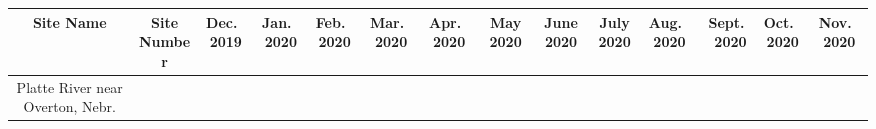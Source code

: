 \documentclass[12pt,]{article}
\begin{document}
\begin{longtable}[]{@{}cccccccccccccc@{}}
\toprule
\begin{minipage}[b]{0.05\columnwidth}\centering
Site Name\strut
\end{minipage} & \begin{minipage}[b]{0.06\columnwidth}\centering
Site Number\strut
\end{minipage} & \begin{minipage}[b]{0.05\columnwidth}\centering
Dec.~2019\strut
\end{minipage} & \begin{minipage}[b]{0.04\columnwidth}\centering
Jan.~2020\strut
\end{minipage} & \begin{minipage}[b]{0.05\columnwidth}\centering
Feb.~2020\strut
\end{minipage} & \begin{minipage}[b]{0.05\columnwidth}\centering
Mar.~2020\strut
\end{minipage} & \begin{minipage}[b]{0.05\columnwidth}\centering
Apr.~2020\strut
\end{minipage} & \begin{minipage}[b]{0.04\columnwidth}\centering
May 2020\strut
\end{minipage} & \begin{minipage}[b]{0.05\columnwidth}\centering
June 2020\strut
\end{minipage} & \begin{minipage}[b]{0.05\columnwidth}\centering
July 2020\strut
\end{minipage} & \begin{minipage}[b]{0.05\columnwidth}\centering
Aug.~2020\strut
\end{minipage} & \begin{minipage}[b]{0.05\columnwidth}\centering
Sept.~2020\strut
\end{minipage} & \begin{minipage}[b]{0.04\columnwidth}\centering
Oct.~2020\strut
\end{minipage} & \begin{minipage}[b]{0.04\columnwidth}\centering
Nov.~2020\strut
\end{minipage}\tabularnewline
\midrule
\endhead
\begin{minipage}[t]{0.05\columnwidth}\centering
Platte River near Overton, Nebr.\strut
\end{minipage} & \begin{minipage}[t]{0.06\columnwidth}\centering

\end{minipage}
\end{longtable}
\end{document}
